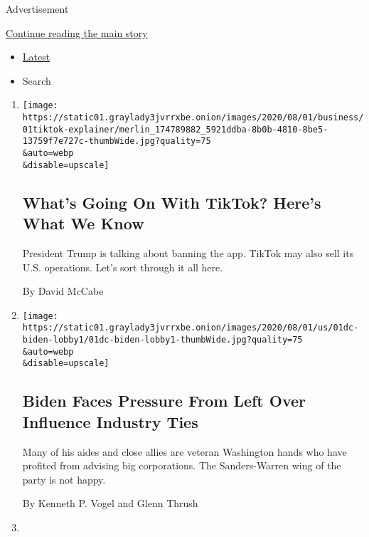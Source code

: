 Advertisement

\protect\hyperlink{after-mid1}{Continue reading the main story}

\begin{itemize}
\tightlist
\item
  \protect\hyperlink{stream-panel}{Latest}
\item
  Search
\end{itemize}

\begin{enumerate}
\def\labelenumi{\arabic{enumi}.}
\item
  \href{/2020/08/01/technology/tiktok-trump-microsoft-bytedance-china-ban.html}{}

  \texttt{[image: https://static01.graylady3jvrrxbe.onion/images/2020/08/01/business/01tiktok-explainer/merlin\_174789882\_5921ddba-8b0b-4810-8be5-13759f7e727c-thumbWide.jpg?quality=75\\\&auto=webp\\\&disable=upscale]}

  \hypertarget{whats-going-on-with-tiktok-heres-what-we-know}{%
  \subsection{What's Going On With TikTok? Here's What We
  Know}\label{whats-going-on-with-tiktok-heres-what-we-know}}

  President Trump is talking about banning the app. TikTok may also sell
  its U.S. operations. Let's sort through it all here.

  By David McCabe
\item
  \href{/2020/08/01/us/politics/biden-lobbyist-ties.html}{}

  \texttt{[image: https://static01.graylady3jvrrxbe.onion/images/2020/08/01/us/01dc-biden-lobby1/01dc-biden-lobby1-thumbWide.jpg?quality=75\\\&auto=webp\\\&disable=upscale]}

  \hypertarget{biden-faces-pressure-from-left-over-influence-industry-ties}{%
  \subsection{Biden Faces Pressure From Left Over Influence Industry
  Ties}\label{biden-faces-pressure-from-left-over-influence-industry-ties}}

  Many of his aides and close allies are veteran Washington hands who
  have profited from advising big corporations. The Sanders-Warren wing
  of the party is not happy.

  By Kenneth P. Vogel and Glenn Thrush
\item
  \href{/2020/08/01/us/politics/trump-books.html}{}


\end{enumerate}
